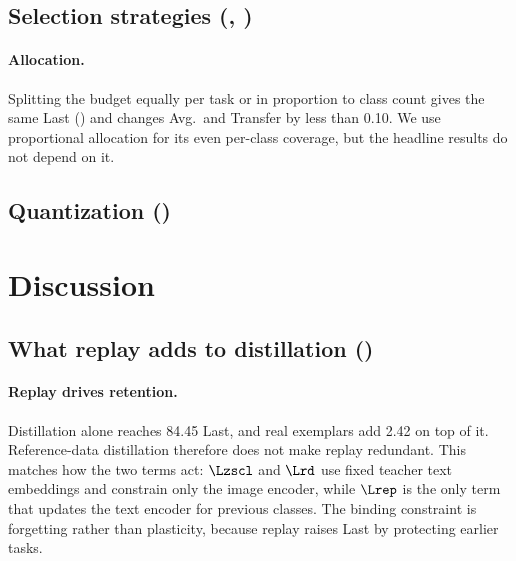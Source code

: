 \subsection{Selection strategies (, )}
\label{sec:abl-select}

\paragraph{Allocation.}
Splitting the budget equally per task or in proportion to class count gives the
same Last () and changes Avg.\ and Transfer by less than 0.10. We use
proportional allocation for its even per-class coverage, but the headline results
do not depend on it.

\subsection{Quantization ()}
\label{sec:abl-quant}

\section{Discussion}
\label{sec:discussion}

\subsection{What replay adds to distillation ()}
\label{sec:disc-q1}

\paragraph{Replay drives retention.}
Distillation alone reaches 84.45 Last, and real exemplars add 2.42 on top of it.
Reference-data distillation therefore does not make replay redundant. This
matches how the two terms act: $\Lzscl$ and $\Lrd$ use fixed teacher text
embeddings and constrain only the image encoder, while $\Lrep$ is the only term
that updates the text encoder for previous classes. The binding constraint is
forgetting rather than plasticity, because replay raises Last by protecting
earlier tasks. 

